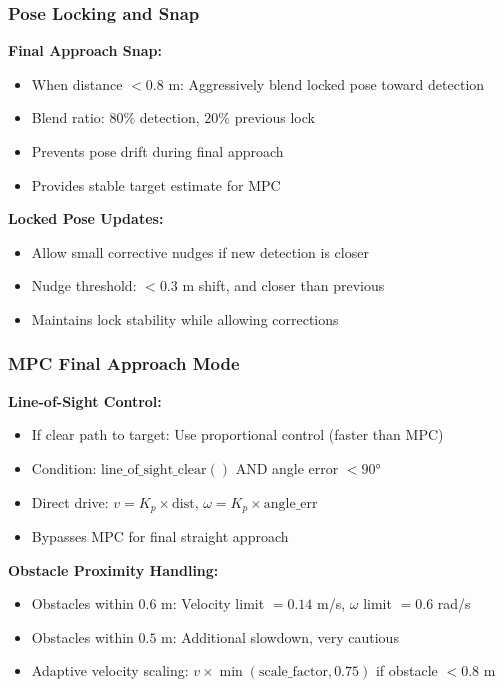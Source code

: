 \documentclass[11pt]{article}
\begin{document}
\subsubsection{Pose Locking and Snap}

\textbf{Final Approach Snap:}
\begin{itemize}
    \item When distance $< 0.8$ m: Aggressively blend locked pose toward detection
    \item Blend ratio: $80\%$ detection, $20\%$ previous lock
    \item Prevents pose drift during final approach
    \item Provides stable target estimate for MPC
\end{itemize}

\textbf{Locked Pose Updates:}
\begin{itemize}
    \item Allow small corrective nudges if new detection is closer
    \item Nudge threshold: $< 0.3$ m shift, and closer than previous
    \item Maintains lock stability while allowing corrections
\end{itemize}

\subsubsection{MPC Final Approach Mode}

\textbf{Line-of-Sight Control:}
\begin{itemize}
    \item If clear path to target: Use proportional control (faster than MPC)
    \item Condition: $\text{line\_of\_sight\_clear}()$ AND angle error $< 90°$
    \item Direct drive: $v = K_p \times \text{dist}$, $\omega = K_p \times \text{angle\_err}$
    \item Bypasses MPC for final straight approach
\end{itemize}

\textbf{Obstacle Proximity Handling:}
\begin{itemize}
    \item Obstacles within $0.6$ m: Velocity limit $= 0.14$ m/s, $\omega$ limit $= 0.6$ rad/s
    \item Obstacles within $0.5$ m: Additional slowdown, very cautious
    \item Adaptive velocity scaling: $v \times \min(\text{scale\_factor}, 0.75)$ if obstacle $< 0.8$ m
\end{itemize}
\end{document}

